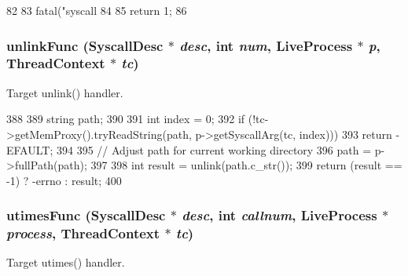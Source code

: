 \begin{DoxyCode}
82 {
83     fatal("syscall %
84 
85     return 1;
86 }
\end{DoxyCode}
\hypertarget{syscall__emul_8hh_a332ee720b2d3c8f128b10627f87a9a67}{
\subsubsection[{unlinkFunc}]{ unlinkFunc ({\bf SyscallDesc} $\ast$ {\em desc}, \/  int {\em num}, \/  {\bf LiveProcess} $\ast$ {\em p}, \/  {\bf ThreadContext} $\ast$ {\em tc})}}
\label{syscall__emul_8hh_a332ee720b2d3c8f128b10627f87a9a67}


Target unlink() handler. 


\begin{DoxyCode}
388 {
389     string path;
390 
391     int index = 0;
392     if (!tc->getMemProxy().tryReadString(path, p->getSyscallArg(tc, index)))
393         return -EFAULT;
394 
395     // Adjust path for current working directory
396     path = p->fullPath(path);
397 
398     int result = unlink(path.c_str());
399     return (result == -1) ? -errno : result;
400 }
\end{DoxyCode}
\hypertarget{syscall__emul_8hh_a14cb480609d141a40fb4b6ad36c7dbed}{
\subsubsection[{utimesFunc}]{ utimesFunc ({\bf SyscallDesc} $\ast$ {\em desc}, \/  int {\em callnum}, \/  {\bf LiveProcess} $\ast$ {\em process}, \/  {\bf ThreadContext} $\ast$ {\em tc})}}
\label{syscall__emul_8hh_a14cb480609d141a40fb4b6ad36c7dbed}


Target utimes() handler. 


